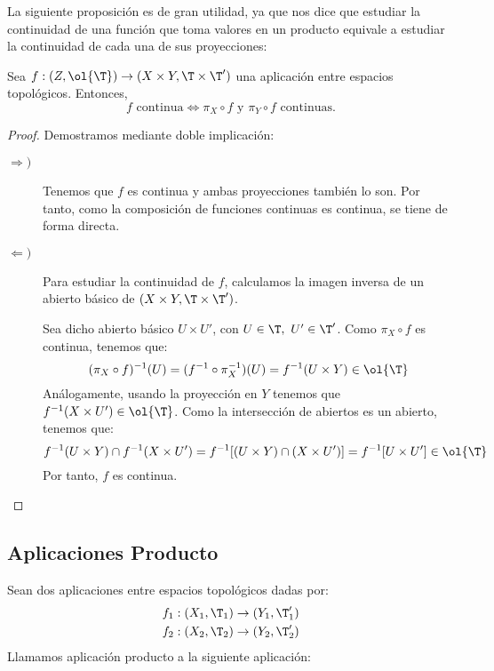 La siguiente proposición es de gran utilidad, ya que nos dice que estudiar la continuidad de una función que toma valores en un producto equivale a estudiar la continuidad de cada una de sus proyecciones:
\begin{prop}\label{prop:cont_comp}
    Sea $f:(Z,\ol{\T})\to (X\times Y, \T\times \T')$ una aplicación entre espacios topológicos. Entonces,
    \begin{equation*}
        f \text{ continua} \Longleftrightarrow
        \pi_X\circ f \text{ y } \pi_Y\circ f \text{ continuas.}
    \end{equation*}
\end{prop}
\begin{proof}
    Demostramos mediante doble implicación:
    \begin{description}
        \item[$\Longrightarrow)$] Tenemos que $f$ es continua y ambas proyecciones también lo son. Por tanto, como la composición de funciones continuas es continua, se tiene de forma directa.

        \item[$\Longleftarrow)$] Para estudiar la continuidad de $f$, calculamos la imagen inversa de un abierto básico de $(X\times Y, \T\times \T')$.

        Sea dicho abierto básico $U\times U'$, con $U\in \T,~U'\in \T'$. Como $\pi_X\circ f$ es continua, tenemos que:
        \begin{equation*}
            (\pi_X\circ f)^{-1}(U) = (f^{-1}\circ \pi_X^{-1})(U) = f^{-1}(U\times Y) \in \ol{\T}
        \end{equation*}
        Análogamente, usando la proyección en $Y$ tenemos que $f^{-1}(X\times U') \in \ol{\T}$. Como la intersección de abiertos es un abierto, tenemos que:
        \begin{equation*}
            f^{-1}(U\times Y) \cap f^{-1}(X\times U') = 
            f^{-1}[(U\times Y)\cap (X\times U')]
            = f^{-1}[U\times U']
            \in \ol{\T}
        \end{equation*}
        Por tanto, $f$ es continua.
    \end{description}
\end{proof}

\subsection{Aplicaciones Producto}

\begin{definicion}
    Sean dos aplicaciones entre espacios topológicos dadas por:
    \begin{gather*}
        f_1:(X_1,\T_1)\to (Y_1,\T_1') \\
        f_2:(X_2,\T_2)\to (Y_2,\T_2')
    \end{gather*}
    Llamamos aplicación producto a la siguiente aplicación:
\end{definicion}


